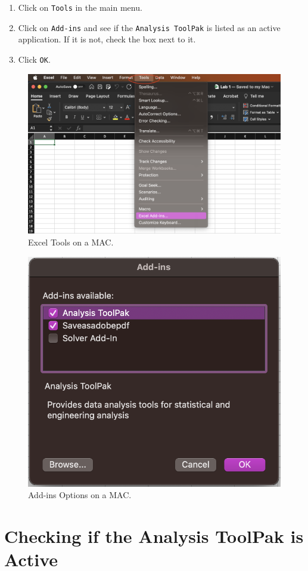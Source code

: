 \documentclass[
  12pt,
  letterpaper,
]{book}
\providecommand{\tightlist}{%
  \setlength{\itemsep}{0pt}\setlength{\parskip}{0pt}}
\begin{document}
\begin{enumerate}
\def\labelenumi{\arabic{enumi}.}
\tightlist
\item
  Click on \texttt{Tools} in the main menu.
\item
  Click on \texttt{Add-ins} and see if the \texttt{Analysis\ ToolPak} is listed as an active application. If it is not, check the box next to it.
\item
  Click \texttt{OK}.
\end{enumerate}

\begin{figure}

{\centering \includegraphics[width=0.75\linewidth]{images/toolpak_mac1} 

}

\caption{Excel Tools on a MAC.}\label{fig:analysis-toolpak-mac1}
\end{figure}
\begin{figure}

{\centering \includegraphics[width=0.4\linewidth]{images/toolpak_mac2} 

}

\caption{Add-ins Options on a MAC.}\label{fig:analysis-toolpak-mac2}
\end{figure}

\hypertarget{checking-if-the-analysis-toolpak-is-active}{%
\section{Checking if the Analysis ToolPak is Active}\label{checking-if-the-analysis-toolpak-is-active}}
\end{document}
